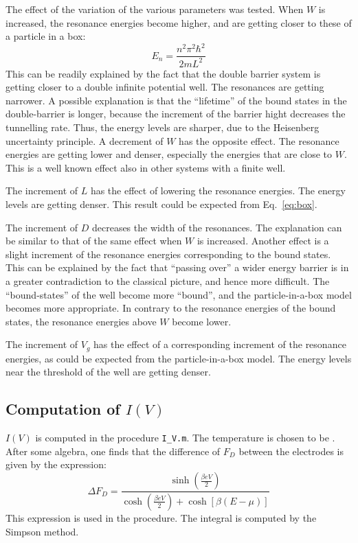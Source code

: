 \documentclass[12pt, a4paper]{article}
\begin{document}
The effect of the variation of the various parameters was tested. When $W$ is increased, the resonance energies become higher, and are getting closer to these of a particle in a box:
\begin{equation}\label{eq:box}
	E_n = \frac{n^2\pi^2\hbar^2}{2mL^2}
\end{equation}
This can be readily explained by the fact that the double barrier system is getting closer to a double infinite potential well. The resonances are getting narrower. A possible explanation is that the ``lifetime'' of the bound states in the double-barrier is longer, because the increment of the barrier hight decreases the tunnelling rate. Thus, the energy levels are sharper, due to the Heisenberg uncertainty principle. A decrement of $W$ has the opposite effect. The resonance energies are getting lower and denser, especially the energies that are close to $W$. This is a well known effect also in other systems with a finite well.

The increment of $L$ has the effect of lowering the resonance energies. The energy levels are getting denser. This result could be expected from Eq.~\eqref{eq:box}.

The increment of $D$ decreases the width of the resonances. The explanation can be similar to that of the same effect when $W$ is increased. Another effect is a slight increment of the resonance energies corresponding to the bound states. This can be explained by the fact that ``passing over'' a wider energy barrier is in a greater contradiction to the classical picture, and hence more difficult. The ``bound-states'' of the well become more ``bound'', and the particle-in-a-box model becomes more appropriate. In contrary to the resonance energies of the bound states, the resonance energies above $W$ become lower.

The increment of $V_g$ has the effect of a corresponding increment of the resonance energies, as could be expected from the particle-in-a-box model. The energy levels near the threshold of the well are getting denser.

\subsection{Computation of $I(V)$}
$I(V)$ is computed in the procedure \texttt{I\_V.m}. The temperature is chosen to be . After some algebra, one finds that the difference of $F_D$ between the electrodes is given by the expression:
\begin{equation}\label{eq:DeltaF}
	\Delta F_D = \frac{\sinh\left(\frac{\beta eV}{2}\right)}{\cosh\left(\frac{\beta eV}{2}\right) + \cosh[\beta(E-\mu)]}
\end{equation}
This expression is used in the procedure. The integral is computed by the Simpson method.
\end{document}
